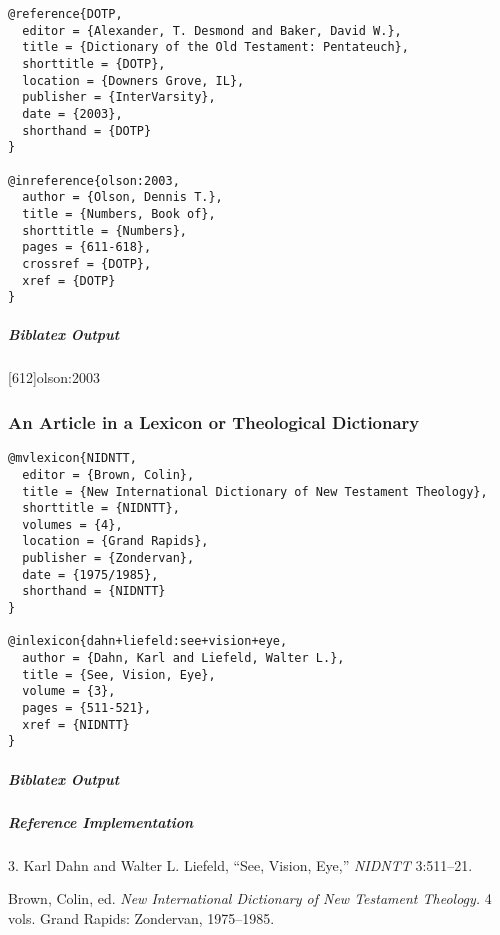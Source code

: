 \documentclass[a4paper]{article}
\newenvironment{biboutput}{%
  \subparagraph{Biblatex Output}
}{\color{black}}
\newenvironment{refimp}{%
  \subparagraph{Reference Implementation}
  \color{reference-colour}
  \rm
}{\par\color{black}}
\begin{document}
\begin{lstlisting}
@reference{DOTP,
  editor = {Alexander, T. Desmond and Baker, David W.},
  title = {Dictionary of the Old Testament: Pentateuch},
  shorttitle = {DOTP},
  location = {Downers Grove, IL},
  publisher = {InterVarsity},
  date = {2003},
  shorthand = {DOTP}
}

@inreference{olson:2003,
  author = {Olson, Dennis T.},
  title = {Numbers, Book of},
  shorttitle = {Numbers},
  pages = {611-618},
  crossref = {DOTP},
  xref = {DOTP}
}
\end{lstlisting}  

\begin{biboutput}
  [612]{olson:2003}
\end{biboutput}

\subsubsection{An Article in a Lexicon or Theological Dictionary}

\begin{lstlisting}
@mvlexicon{NIDNTT,
  editor = {Brown, Colin},
  title = {New International Dictionary of New Testament Theology},
  shorttitle = {NIDNTT},
  volumes = {4},
  location = {Grand Rapids},
  publisher = {Zondervan},
  date = {1975/1985},
  shorthand = {NIDNTT}
}

@inlexicon{dahn+liefeld:see+vision+eye,
  author = {Dahn, Karl and Liefeld, Walter L.},
  title = {See, Vision, Eye},
  volume = {3},
  pages = {511-521},
  xref = {NIDNTT}
}
\end{lstlisting}

\begin{biboutput}
\end{biboutput}

\begin{refimp}
  \hspace*{\bibindent}3. Karl Dahn and Walter L. Liefeld, “See, Vision, Eye,”
  \emph{NIDNTT} 3:511–21.

  \hangindent\bibindent Brown, Colin, ed. \emph{New International Dictionary
  of New Testament Theology.} 4 vols. Grand Rapids: Zondervan, 1975–1985.

\end{refimp}
\end{document}
